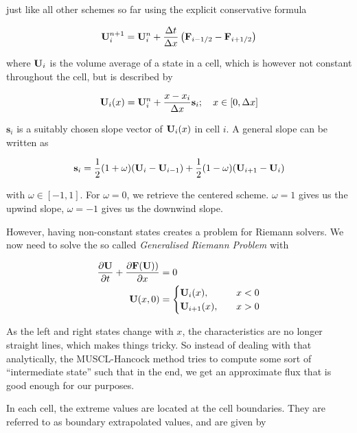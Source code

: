 just like all other schemes so far using the explicit conservative formula

\begin{equation}
	\mathbf{U}_i^{n+1} = \mathbf{U}_i^n + \frac{\Delta t}{\Delta x} \left( \mathbf{F}_{i-1/2} - \mathbf{F}_{i + 1/2} \right)
\end{equation}

where $\mathbf{U}_i$ is the volume average of a state in a cell, which is however not constant throughout the cell, but is described by

\begin{equation}
	\mathbf{U}_{i}(x) = \mathbf{U}_i^n + \frac{x - x_i}{\Delta x} \mathbf{s}_i; \quad x \in [0, \Delta x]
\end{equation}


$\mathbf{s}_i$ is a suitably chosen slope vector of $\mathbf{U}_i(x)$ in cell $i$.
A general slope can be written as

\begin{equation}
 	\mathbf{s}_i = \frac{1}{2} (1 + \omega) (\mathbf{U}_i - \mathbf{U}_{i-1}) + \frac{1}{2} (1 - \omega) (\mathbf{U}_{i+1} - \mathbf{U}_i)
\end{equation}

with $\omega \in [-1, 1]$.
For $\omega = 0$, we retrieve the centered scheme.
$\omega = 1$ gives us the upwind slope, $\omega = -1$ gives us the downwind slope.


However, having non-constant states creates a problem for Riemann solvers.
We now need to solve the so called \emph{Generalised Riemann Problem} with

\begin{align}
	\frac{\partial \mathbf{U}}{\partial t} + \frac{\partial \mathbf{F}(\mathbf{U}))}{\partial x} &= 0 \\
	\mathbf{U}(x, 0) &= 
	\begin{cases}
		\mathbf{U}_i(x), & \quad x < 0 \\
		\mathbf{U}_{i+1}(x), & \quad x > 0 \\
	\end{cases}
\end{align}

As the left and right states change with $x$, the characteristics are no longer straight lines, which makes things tricky.
So instead of dealing with that analytically, the MUSCL-Hancock method tries to compute some sort of ``intermediate state'' such that in the end, we get an approximate flux that is good enough for our purposes.

In each cell, the extreme values are located at the cell boundaries.
They are referred to as boundary extrapolated values, and are given by

